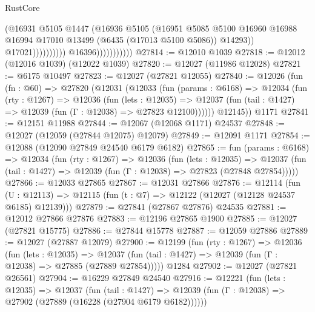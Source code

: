 \begin{lexlean}{RustCore}
\begin{coremodule}
                                            (@16931
                                              @5105
                                              @1447
                                              (@16936
                                                @5105
                                                (@16951
                                                  @5085
                                                  @5100
                                                  @16960
                                                  @16988
                                                  @16994
                                                  @17010
                                                  @13499
                                                  (@6435 (@17013 @5100 @5086))
                                                  @14293))
                                              @17021))))))))))
                          @16396)))))))))))
@27814 := @12010 @1039
@27818 := @12012 (@12016 @1039) (@12022 @1039)
@27820 := @12027 (@11986 @12028)
@27821 := @6175 @10497
@27823 := @12027 (@27821 @12055)
@27840 := @12026
    (fun (fn : @60) =>
    @27820
      (@12031
        (@12033
          (fun (params : @6168) =>
          @12034
            (fun (rty : @1267) =>
            @12036
              (fun (lets : @12035) =>
              @12037 (fun (tail : @1427) => @12039 (fun (Γ : @12038) => @27823 @12100))))))
        @12145))
    @1171
@27841 := @12151 @11988
@27844 := @12067 (@12068 @1171) @24537
@27848 := @12027 (@12059 (@27844 @12075) @12079)
@27849 := @12091 @1171
@27854 := @12088 (@12090 @27849 @24540 @6179 @6182)
@27865 := fun (params : @6168) =>
  @12034
    (fun (rty : @1267) =>
    @12036
      (fun (lets : @12035) =>
      @12037 (fun (tail : @1427) => @12039 (fun (Γ : @12038) => @27823 (@27848 @27854)))))
@27866 := @12033 @27865
@27867 := @12031 @27866
@27876 := @12114
    (fun (U : @12113) => @12115 (fun (t : @7) => @12122 (@12027 (@12128 @24537 @6185) @12139)))
@27879 := @27841 (@27867 @27876) @24535
@27881 := @12012 @27866 @27876
@27883 := @12196 @27865 @1900
@27885 := @12027 (@27821 @15775)
@27886 := @27844 @15778
@27887 := @12059 @27886
@27889 := @12027 (@27887 @12079)
@27900 := @12199
    (fun (rty : @1267) =>
    @12036
      (fun (lets : @12035) =>
      @12037 (fun (tail : @1427) => @12039 (fun (Γ : @12038) => @27885 (@27889 @27854)))))
    @1284
@27902 := @12027 (@27821 @26561)
@27904 := @16229 @27849 @24540
@27916 := @12221
    (fun (lets : @12035) =>
    @12037
      (fun (tail : @1427) =>
      @12039 (fun (Γ : @12038) => @27902 (@27889 (@16228 (@27904 @6179 @6182))))))

\end{coremodule}
\end{lexlean}
